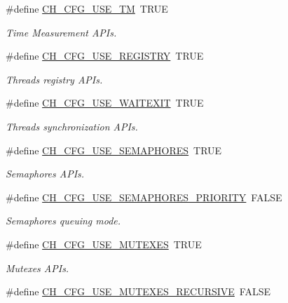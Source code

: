 \begin{DoxyCompactItemize}
\item 
\#define \hyperlink{group__config_ga1bd0fe5d119a7de890025214ae249c1d}{C\+H\+\_\+\+C\+F\+G\+\_\+\+U\+S\+E\+\_\+\+T\+M}~T\+R\+U\+E
\begin{DoxyCompactList}\small\item\em Time Measurement A\+P\+Is. \end{DoxyCompactList}\item 
\#define \hyperlink{group__config_gaefe648290026609c1a1ee2d687ff60c1}{C\+H\+\_\+\+C\+F\+G\+\_\+\+U\+S\+E\+\_\+\+R\+E\+G\+I\+S\+T\+R\+Y}~T\+R\+U\+E
\begin{DoxyCompactList}\small\item\em Threads registry A\+P\+Is. \end{DoxyCompactList}\item 
\#define \hyperlink{group__config_ga2e46052c737bba99ac4b45f834149fc4}{C\+H\+\_\+\+C\+F\+G\+\_\+\+U\+S\+E\+\_\+\+W\+A\+I\+T\+E\+X\+I\+T}~T\+R\+U\+E
\begin{DoxyCompactList}\small\item\em Threads synchronization A\+P\+Is. \end{DoxyCompactList}\item 
\#define \hyperlink{group__config_gae66a111a6efc858624b42c8370b62cf6}{C\+H\+\_\+\+C\+F\+G\+\_\+\+U\+S\+E\+\_\+\+S\+E\+M\+A\+P\+H\+O\+R\+E\+S}~T\+R\+U\+E
\begin{DoxyCompactList}\small\item\em Semaphores A\+P\+Is. \end{DoxyCompactList}\item 
\#define \hyperlink{group__config_ga04e4e037498950df8bdef88bdd199494}{C\+H\+\_\+\+C\+F\+G\+\_\+\+U\+S\+E\+\_\+\+S\+E\+M\+A\+P\+H\+O\+R\+E\+S\+\_\+\+P\+R\+I\+O\+R\+I\+T\+Y}~F\+A\+L\+S\+E
\begin{DoxyCompactList}\small\item\em Semaphores queuing mode. \end{DoxyCompactList}\item 
\#define \hyperlink{group__config_ga7263b362a62e34158d09b44b4c204c27}{C\+H\+\_\+\+C\+F\+G\+\_\+\+U\+S\+E\+\_\+\+M\+U\+T\+E\+X\+E\+S}~T\+R\+U\+E
\begin{DoxyCompactList}\small\item\em Mutexes A\+P\+Is. \end{DoxyCompactList}\item 
\#define \hyperlink{group__config_gab9a61e9638af4b918ebad4e177dead4d}{C\+H\+\_\+\+C\+F\+G\+\_\+\+U\+S\+E\+\_\+\+M\+U\+T\+E\+X\+E\+S\+\_\+\+R\+E\+C\+U\+R\+S\+I\+V\+E}~F\+A\+L\+S\+E

\end{DoxyCompactItemize}
